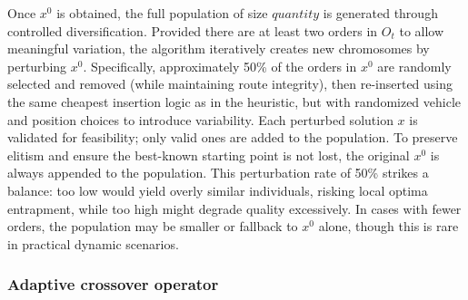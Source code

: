 \documentclass[preprint,12pt]{elsarticle}
\begin{document}
Once $x^0$ is obtained, the full population of size $quantity$ is generated through controlled diversification. Provided there are at least two orders in $O_t$ to allow meaningful variation, the algorithm iteratively creates new chromosomes by perturbing $x^0$. Specifically, approximately 50\% of the orders in $x^0$ are randomly selected and removed (while maintaining route integrity), then re-inserted using the same cheapest insertion logic as in the heuristic, but with randomized vehicle and position choices to introduce variability. Each perturbed solution $x$ is validated for feasibility; only valid ones are added to the population. To preserve elitism and ensure the best-known starting point is not lost, the original $x^0$ is always appended to the population. This perturbation rate of 50\% strikes a balance: too low would yield overly similar individuals, risking local optima entrapment, while too high might degrade quality excessively. In cases with fewer orders, the population may be smaller or fallback to $x^0$ alone, though this is rare in practical dynamic scenarios.


\subsubsection{Adaptive crossover operator}
\label{sec:adap_cross}

\end{document}
